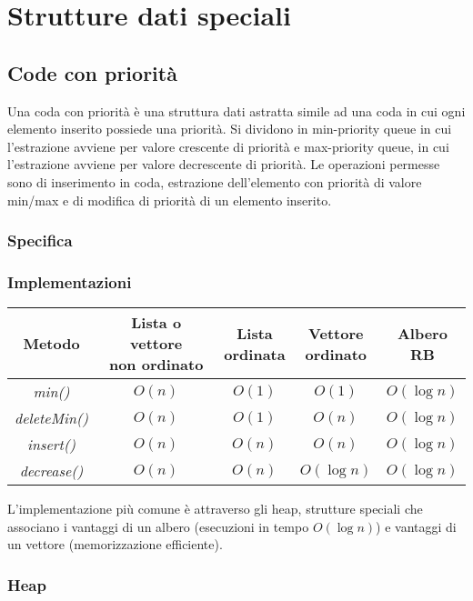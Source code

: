 \chapter{Strutture dati speciali}
\section{Code con priorit\`a}
Una coda con priorit\`a \`e una struttura dati astratta simile ad una coda in cui ogni elemento inserito possiede una priorit\`a. Si dividono in min-priority 
queue in cui l'estrazione avviene per valore crescente di priorit\`a e max-priority queue, in cui l'estrazione avviene per valore decrescente di priorit\`a.
Le operazioni permesse sono di inserimento in coda, estrazione dell'elemento con priorit\`a di valore min/max e di modifica di priorit\`a di un elemento 
inserito.
\subsection{Specifica}

\subsection{Implementazioni}
\begin{center}
\begin{tabular}{|c|c|c|c|c|}
\hline
Metodo & \makecell{Lista o vettore \\non ordinato} & \makecell{Lista\\ordinata} & \makecell{Vettore\\ordinato} & \makecell{Albero\\RB}\\
\hline
\emph{min()} & $O(n)$ & $O(1)$ & $O(1)$ & $O(\log n)$\\
\hline
\emph{deleteMin()} & $O(n)$ & $O(1)$ & $O(n)$ & $O(\log n)$\\
\hline
\emph{insert()} & $O(n)$ & $O(n)$ & $O(n)$ & $O(\log n)$\\
\hline
\emph{decrease()} & $O(n)$ & $O(n)$ & $O(\log n)$ & $O(\log n)$\\
\hline
\end{tabular}
\end{center}
L'implementazione pi\`u comune \`e attraverso gli heap, strutture speciali che associano i vantaggi di un albero (esecuzioni in tempo $O(\log n)$) e 
vantaggi di un vettore (memorizzazione efficiente).
\subsection{Heap}
